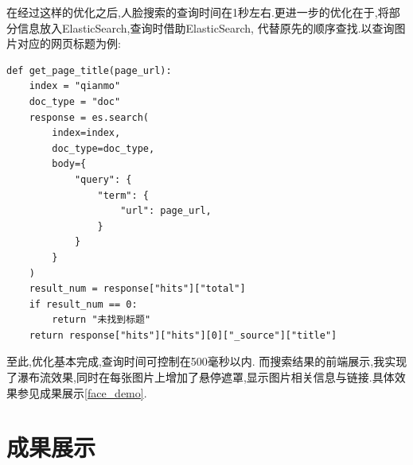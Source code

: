 \documentclass[a4paper]{article}
\begin{document}
在经过这样的优化之后,人脸搜索的查询时间在1秒左右.更进一步的优化在于,将部分信息放入ElasticSearch,查询时借助ElasticSearch,
代替原先的顺序查找.以查询图片对应的网页标题为例:
\begin{verbatim}
def get_page_title(page_url):
    index = "qianmo"
    doc_type = "doc"
    response = es.search(
        index=index,
        doc_type=doc_type,
        body={
            "query": {
                "term": {
                    "url": page_url,
                }
            }
        }
    )
    result_num = response["hits"]["total"]
    if result_num == 0:
        return "未找到标题"
    return response["hits"]["hits"][0]["_source"]["title"]
\end{verbatim}

至此,优化基本完成,查询时间可控制在500毫秒以内.
而搜索结果的前端展示,我实现了瀑布流效果,同时在每张图片上增加了悬停遮罩,显示图片相关信息与链接.具体效果参见成果展示\ref{face_demo}.
    \newpage
    \section{成果展示}
\end{document}
